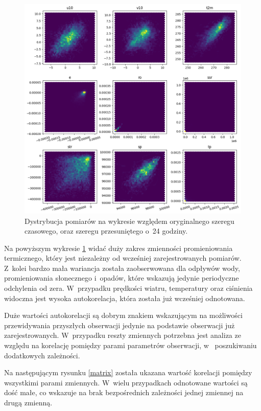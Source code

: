 \begin{figure}[H]
    \centering
    \includegraphics[width=\textwidth]{images/autocorrelation_hex.png}
    \caption[Dystrybucja szeregu przesuniętego]{Dystrybucja pomiarów na wykresie względem oryginalnego szeregu czasowego,
    oraz szeregu przesuniętego o~24 godziny.}
    \label{hex}
\end{figure}

Na powyższym wykresie \ref{hex} widać duży zakres zmienności promieniowania termicznego,
który jest niezależny od wcześniej zarejestrowanych pomiarów. Z~kolei bardzo mała wariancja 
została zaobserwowana dla odpływów wody, promieniowania słonecznego i~opadów, które wskazują 
jedynie periodyczne odchylenia od zera. W~przypadku prędkości wiatru, temperatury oraz 
ciśnienia widoczna jest wysoka autokorelacja, która została już wcześniej odnotowana. 

Duże wartości autokorelacji są dobrym znakiem wskazującym na możliwości przewidywania przyszłych
obserwacji jedynie na podstawie obserwacji już zarejestrowanych. W~przypadku reszty zmiennych
potrzebna jest analiza ze względu na korelację pomiędzy parami parametrów obserwacji, w~
poszukiwaniu dodatkowych zależności.

Na następującym rysunku \ref{matrix} została ukazana wartość korelacji pomiędzy wszystkimi 
parami zmiennych. W~wielu przypadkach odnotowane wartości są dość małe, co wskazuje na brak
bezpośrednich zależności jednej zmiennej na drugą zmienną. 

